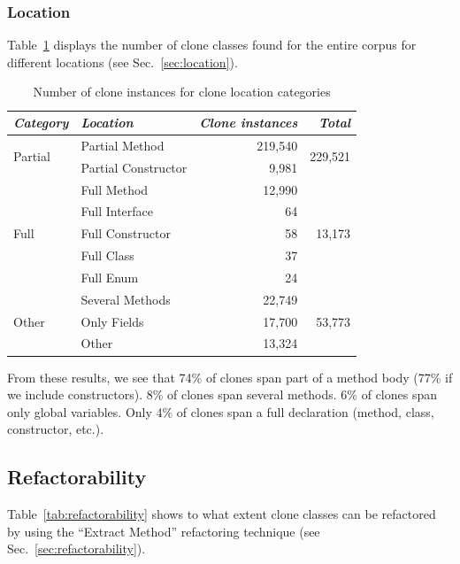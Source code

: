 \documentclass[sigconf,review, table]{acmart}
\begin{document}
\subsubsection{Location}
Table~\ref{tab:location} displays the number of clone classes found for the entire corpus for different locations (see Sec.~\ref{sec:location}).

\begin{table}[H]
\centering
\begin{tabular}{@{}llrr@{}}
\toprule
\textit{\textbf{Category}} & \textit{\textbf{Location}} & \textit{\textbf{Clone instances}} & \textit{\textbf{Total}} \\ \midrule
\multirow{2}{*}{Partial} & Partial Method & 219,540 & \multirow{2}{*}{229,521} \\ \cmidrule(lr){2-3}
 & Partial Constructor & 9,981 &  \\ \midrule
\multirow{5}{*}{Full} & Full Method & 12,990 & \multirow{5}{*}{13,173} \\ \cmidrule(lr){2-3}
 & Full Interface & 64 &  \\ \cmidrule(lr){2-3}
 & Full Constructor & 58 &  \\ \cmidrule(lr){2-3}
 & Full Class & 37 &  \\ \cmidrule(lr){2-3}
 & Full Enum & 24 &  \\ \midrule
\multirow{3}{*}{Other} & Several Methods & 22,749 & \multirow{3}{*}{53,773} \\ \cmidrule(lr){2-3}
 & Only Fields & 17,700 &  \\ \cmidrule(lr){2-3}
 & Other & 13,324 &  \\ \bottomrule
\end{tabular}
\caption{Number of clone instances for clone location categories}
\label{tab:location}
\end{table}

From these results, we see that 74\% of clones span part of a method body (77\% if we include constructors). 8\% of clones span several methods. 6\% of clones span only global variables. Only 4\% of clones span a full declaration (method, class, constructor, etc.).

\subsection{Refactorability}
Table~\ref{tab:refactorability} shows to what extent clone classes can be refactored by using the ``Extract Method'' refactoring technique (see Sec.~\ref{sec:refactorability}).
\end{document}
